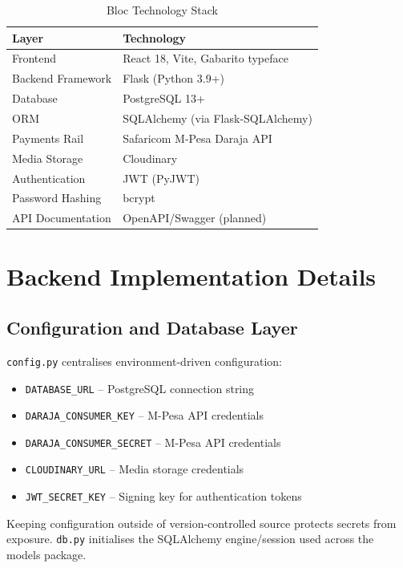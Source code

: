 \documentclass[12pt, a4paper, twoside, openright]{report}
\begin{document}
\begin{table}[H]
    \centering
    \begin{tabularx}{\textwidth}{|l|l|}
    \hline
    \textbf{Layer} & \textbf{Technology} \\
    \hline
    Frontend & React 18, Vite, Gabarito typeface \\
    \hline
    Backend Framework & Flask (Python 3.9+) \\
    \hline
    Database & PostgreSQL 13+ \\
    \hline
    ORM & SQLAlchemy (via Flask-SQLAlchemy) \\
    \hline
    Payments Rail & Safaricom M-Pesa Daraja API \\
    \hline
    Media Storage & Cloudinary \\
    \hline
    Authentication & JWT (PyJWT) \\
    \hline
    Password Hashing & bcrypt \\
    \hline
    API Documentation & OpenAPI/Swagger (planned) \\
    \hline
    \end{tabularx}
    \caption{Bloc Technology Stack}
\end{table}

\section{Backend Implementation Details}

\subsection{Configuration and Database Layer}

\texttt{config.py} centralises environment-driven configuration:
\begin{itemize}
    \item \texttt{DATABASE\_URL} -- PostgreSQL connection string
    \item \texttt{DARAJA\_CONSUMER\_KEY} -- M-Pesa API credentials
    \item \texttt{DARAJA\_CONSUMER\_SECRET} -- M-Pesa API credentials
    \item \texttt{CLOUDINARY\_URL} -- Media storage credentials
    \item \texttt{JWT\_SECRET\_KEY} -- Signing key for authentication tokens
\end{itemize}

Keeping configuration outside of version-controlled source protects secrets from exposure. \texttt{db.py} initialises the SQLAlchemy engine/session used across the models package.
\end{document}
